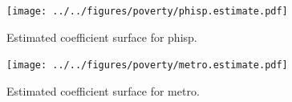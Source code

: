 \documentclass[authoryear, review, 11pt]{elsarticle}
\begin{document}
			
			\begin{figure}
				\begin{center}
					\texttt{[image: ../../figures/poverty/phisp.estimate.pdf]}
					\caption{Estimated coefficient surface for phisp.\label{fig:phisp}}
				\end{center}
			\end{figure}
						
			
			\begin{figure}
				\begin{center}
					\texttt{[image: ../../figures/poverty/metro.estimate.pdf]}
					\caption{Estimated coefficient surface for metro.\label{fig:metro}}
				\end{center}
			\end{figure}
			


			


\end{document}
